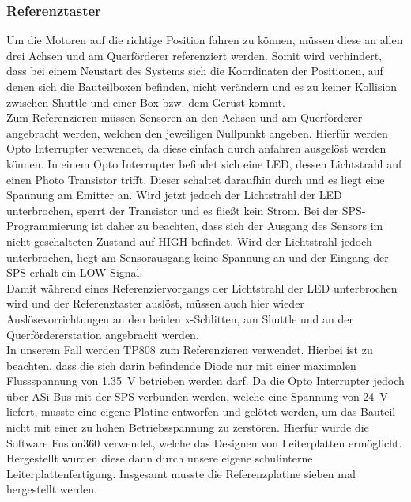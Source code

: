 \subsubsection{Referenztaster}
Um die Motoren auf die richtige Position fahren zu können, müssen diese an allen drei Achsen und am Querförderer referenziert werden. Somit wird verhindert, dass bei einem Neustart des Systems sich die Koordinaten der Positionen, auf denen sich die Bauteilboxen befinden, nicht verändern und es zu keiner Kollision zwischen Shuttle und einer Box bzw. dem Gerüst kommt.\\
Zum Referenzieren müssen Sensoren an den Achsen und am Querförderer angebracht werden, welchen den jeweiligen Nullpunkt angeben. Hierfür werden Opto Interrupter verwendet, da diese einfach durch anfahren ausgelöst werden können. In einem Opto Interrupter befindet sich eine LED, dessen Lichtstrahl auf einen Photo Transistor trifft. Dieser schaltet daraufhin durch und es liegt eine Spannung am Emitter an. Wird jetzt jedoch der Lichtstrahl der LED unterbrochen, sperrt der Transistor und es fließt kein Strom. Bei der SPS-Programmierung ist daher zu beachten, dass sich der Ausgang des Sensors im nicht geschalteten Zustand auf HIGH befindet. Wird der Lichtstrahl jedoch unterbrochen, liegt am Sensorausgang keine Spannung an und der Eingang der SPS erhält ein LOW Signal.\\
Damit während eines Referenziervorgangs der Lichtstrahl der LED unterbrochen wird und der Referenztaster auslöst, müssen auch hier wieder Auslösevorrichtungen an den beiden x-Schlitten, am Shuttle und an der Querfördererstation angebracht werden.\\
In unserem Fall werden TP808 zum Referenzieren verwendet. Hierbei ist zu beachten, dass die sich darin befindende Diode nur mit einer maximalen Flussspannung von \qty{1.35}{\volt} betrieben werden darf.\cite{TP808} Da die Opto Interrupter jedoch über ASi-Bus mit der SPS verbunden werden, welche eine Spannung von \qty{24}{\volt} liefert, musste eine eigene Platine entworfen und gelötet werden, um das Bauteil nicht mit einer zu hohen Betriebsspannung zu zerstören. Hierfür wurde die Software Fusion360 verwendet, welche das Designen von Leiterplatten ermöglicht. Hergestellt wurden diese dann durch unsere eigene schulinterne Leiterplattenfertigung. Insgesamt musste die Referenzplatine sieben mal hergestellt werden.

